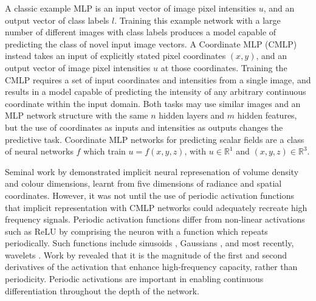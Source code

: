 \documentclass[manuscript.tex]{subfiles}
\begin{document}
A classic example MLP is an input vector of image pixel intensities \(u\), and an output vector of class labels \(l\). %
Training this example network with a large number of different images with class labels produces a model capable of predicting the class of novel input image vectors.
A Coordinate MLP (CMLP) instead takes an input of explicitly stated pixel coordinates \((x,y)\), and an output vector of image pixel intensities \(u\) at those coordinates.
Training the CMLP requires a set of input coordinates and intensities from a single image, and results in a model capable of predicting the intensity of any arbitrary continuous coordinate within the input domain.
Both tasks may use similar images and an MLP network structure with the same \(n\) hidden layers and \(m\) hidden features, but the use of coordinates as inputs and intensities as outputs changes the predictive task.
Coordinate MLP networks for predicting scalar fields are a class of neural networks \(f\) which train \(u = f(x,y,z)\), with \(u\in\mathbb{R}^1\) and \((x,y,z)\in\mathbb{R}^3\).

Seminal work by \parencite{mildenhallNeRFRepresentingScenes2020} demonstrated implicit neural represenation of volume density and colour dimensions, learnt from five dimensions of radiance and spatial coordinates.
However, it was not until the use of periodic activation functions \parencite{sitzmann2019siren} that implicit representation with CMLP networks could adequately recreate high frequency signals.
Periodic activation functions differ from non-linear activations such as ReLU by comprising the neuron with a function which repeats periodically.
Such functions include sinusoids \parencite{sitzmann2019siren}, Gaussians \parencite{ramasinghePeriodicityUnifyingFramework2022}, and most recently, wavelets \parencite{saragadamWIREWaveletImplicit2023}.
Work by \parencite{ramasinghePeriodicityUnifyingFramework2022} revealed that it is the magnitude of the first and second derivatives of the activation that enhance high-frequency capacity, rather than periodicity.
Periodic activations are important in enabling continuous differentiation throughout the depth of the network.
\end{document}
